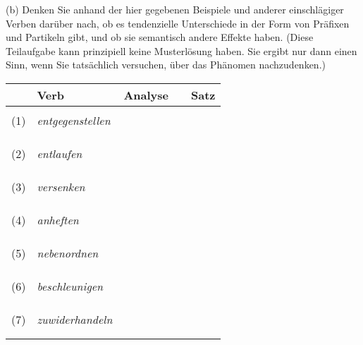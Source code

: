 \documentclass[12pt,a4paper,twoside]{article}
\begin{document}
(b) Denken Sie anhand der hier gegebenen Beispiele und anderer einschlägiger Verben darüber nach, ob es tendenzielle Unterschiede in der Form von Präfixen und Partikeln gibt, und ob sie semantisch andere Effekte haben.
(Diese Teilaufgabe kann prinzipiell keine Musterlösung haben.
Sie ergibt nur dann einen Sinn, wenn Sie tatsächlich versuchen, über das Phänomen nachzudenken.)

\begin{center}
  \begin{tabular}[h]{clp{}p{}p{}}
    \toprule
    & Verb & Analyse && Satz \\
    \midrule
    &&&& \\
    (1) & \textit{entgegenstellen} &&& \\\cline{3-3}\cline{5-5}
        &&&& \\
        &&&& \\\cline{5-5}
    &&&& \\
    (2) & \textit{entlaufen} &&& \\\cline{3-3}\cline{5-5}
        &&&& \\
        &&&& \\\cline{5-5}
    &&&& \\
    (3) & \textit{versenken} &&& \\\cline{3-3}\cline{5-5}
        &&&& \\
        &&&& \\\cline{5-5}
    &&&& \\
    (4) & \textit{anheften} &&& \\\cline{3-3}\cline{5-5}
        &&&& \\
        &&&& \\\cline{5-5}
    &&&& \\
    (5) & \textit{nebenordnen} &&& \\\cline{3-3}\cline{5-5}
        &&&& \\
        &&&& \\\cline{5-5}
    &&&& \\
    (6) & \textit{beschleunigen} &&& \\\cline{3-3}\cline{5-5}
        &&&& \\
        &&&& \\\cline{5-5}
    &&&& \\
    (7) & \textit{zuwiderhandeln} &&& \\\cline{3-3}\cline{5-5}
        &&&& \\
        &&&& \\\cline{5-5}
  \end{tabular}
\end{center}
\end{document}
